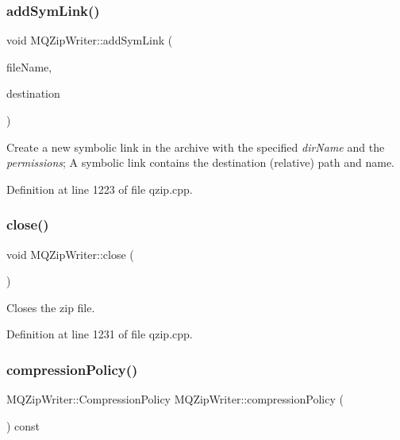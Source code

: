 \subsubsection{\texorpdfstring{add\+Sym\+Link()}{addSymLink()}}
{\footnotesize\ttfamily void M\+Q\+Zip\+Writer\+::add\+Sym\+Link (\begin{DoxyParamCaption}\item[{const Q\+String \&}]{file\+Name,  }\item[{const Q\+String \&}]{destination }\end{DoxyParamCaption})}

Create a new symbolic link in the archive with the specified {\itshape dir\+Name} and the {\itshape permissions}; A symbolic link contains the destination (relative) path and name. 

Definition at line 1223 of file qzip.\+cpp.

\mbox{\label{class_m_q_zip_writer_a4553036171792fd6f254b28cc68818f6}} 
\subsubsection{\texorpdfstring{close()}{close()}}
{\footnotesize\ttfamily void M\+Q\+Zip\+Writer\+::close (\begin{DoxyParamCaption}{ }\end{DoxyParamCaption})}

Closes the zip file. 

Definition at line 1231 of file qzip.\+cpp.

\mbox{\label{class_m_q_zip_writer_aa43250ac355d31da13d5eaa018d50c15}} 
\subsubsection{\texorpdfstring{compression\+Policy()}{compressionPolicy()}}
{\footnotesize\ttfamily M\+Q\+Zip\+Writer\+::\+Compression\+Policy M\+Q\+Zip\+Writer\+::compression\+Policy (\begin{DoxyParamCaption}{ }\end{DoxyParamCaption}) const}

